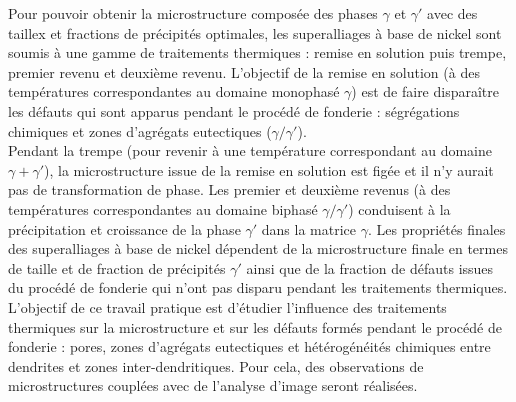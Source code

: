 Pour pouvoir obtenir la microstructure composée des phases $\gamma$ et $\gamma'$
avec des taillex et fractions de précipités optimales, les superalliages à base de
nickel sont soumis à une gamme de traitements thermiques : remise en solution puis
trempe, premier revenu et deuxième revenu. L’objectif de la remise en solution
(à des températures correspondantes au domaine monophasé $\gamma$) est de faire
disparaître les défauts qui sont apparus pendant le procédé de fonderie : 
ségrégations chimiques et zones d’agrégats eutectiques ($\gamma / \gamma'$).\\

Pendant la trempe (pour revenir à une température correspondant au domaine
$\gamma + \gamma'$), la microstructure issue de la remise en solution est figée 
et il n’y aurait pas de transformation de phase. Les premier et deuxième revenus 
(à des températures correspondantes au domaine biphasé $\gamma / \gamma'$) conduisent
à la précipitation et croissance de la phase $\gamma'$ dans la matrice $\gamma$. 
Les propriétés finales des superalliages à base de nickel dépendent de la microstructure 
finale en termes de taille et de fraction de précipités $\gamma'$ ainsi que de la 
fraction de défauts issues du procédé de fonderie qui n’ont pas disparu pendant 
les traitements thermiques.\\


L’objectif de ce travail pratique est d’étudier l’influence des traitements thermiques 
sur la microstructure et sur les défauts formés pendant le procédé de fonderie : pores, 
zones d’agrégats eutectiques et hétérogénéités chimiques entre dendrites et zones 
inter-dendritiques. Pour cela, des observations de microstructures couplées avec de 
l’analyse d’image seront réalisées.\\
